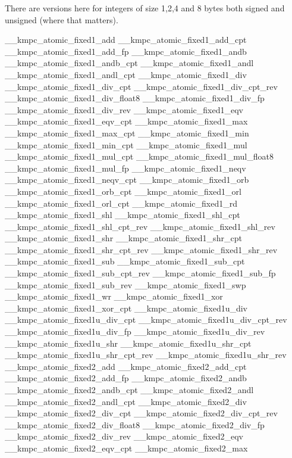 There are versions here for integers of size 1,2,4 and 8 bytes both signed and unsigned (where that matters). 
\begin{DoxyCode}
\_\_kmpc\_atomic\_fixed1\_add
\_\_kmpc\_atomic\_fixed1\_add\_cpt
\_\_kmpc\_atomic\_fixed1\_add\_fp
\_\_kmpc\_atomic\_fixed1\_andb
\_\_kmpc\_atomic\_fixed1\_andb\_cpt
\_\_kmpc\_atomic\_fixed1\_andl
\_\_kmpc\_atomic\_fixed1\_andl\_cpt
\_\_kmpc\_atomic\_fixed1\_div
\_\_kmpc\_atomic\_fixed1\_div\_cpt
\_\_kmpc\_atomic\_fixed1\_div\_cpt\_rev
\_\_kmpc\_atomic\_fixed1\_div\_float8
\_\_kmpc\_atomic\_fixed1\_div\_fp
\_\_kmpc\_atomic\_fixed1\_div\_rev
\_\_kmpc\_atomic\_fixed1\_eqv
\_\_kmpc\_atomic\_fixed1\_eqv\_cpt
\_\_kmpc\_atomic\_fixed1\_max
\_\_kmpc\_atomic\_fixed1\_max\_cpt
\_\_kmpc\_atomic\_fixed1\_min
\_\_kmpc\_atomic\_fixed1\_min\_cpt
\_\_kmpc\_atomic\_fixed1\_mul
\_\_kmpc\_atomic\_fixed1\_mul\_cpt
\_\_kmpc\_atomic\_fixed1\_mul\_float8
\_\_kmpc\_atomic\_fixed1\_mul\_fp
\_\_kmpc\_atomic\_fixed1\_neqv
\_\_kmpc\_atomic\_fixed1\_neqv\_cpt
\_\_kmpc\_atomic\_fixed1\_orb
\_\_kmpc\_atomic\_fixed1\_orb\_cpt
\_\_kmpc\_atomic\_fixed1\_orl
\_\_kmpc\_atomic\_fixed1\_orl\_cpt
\_\_kmpc\_atomic\_fixed1\_rd
\_\_kmpc\_atomic\_fixed1\_shl
\_\_kmpc\_atomic\_fixed1\_shl\_cpt
\_\_kmpc\_atomic\_fixed1\_shl\_cpt\_rev
\_\_kmpc\_atomic\_fixed1\_shl\_rev
\_\_kmpc\_atomic\_fixed1\_shr
\_\_kmpc\_atomic\_fixed1\_shr\_cpt
\_\_kmpc\_atomic\_fixed1\_shr\_cpt\_rev
\_\_kmpc\_atomic\_fixed1\_shr\_rev
\_\_kmpc\_atomic\_fixed1\_sub
\_\_kmpc\_atomic\_fixed1\_sub\_cpt
\_\_kmpc\_atomic\_fixed1\_sub\_cpt\_rev
\_\_kmpc\_atomic\_fixed1\_sub\_fp
\_\_kmpc\_atomic\_fixed1\_sub\_rev
\_\_kmpc\_atomic\_fixed1\_swp
\_\_kmpc\_atomic\_fixed1\_wr
\_\_kmpc\_atomic\_fixed1\_xor
\_\_kmpc\_atomic\_fixed1\_xor\_cpt
\_\_kmpc\_atomic\_fixed1u\_div
\_\_kmpc\_atomic\_fixed1u\_div\_cpt
\_\_kmpc\_atomic\_fixed1u\_div\_cpt\_rev
\_\_kmpc\_atomic\_fixed1u\_div\_fp
\_\_kmpc\_atomic\_fixed1u\_div\_rev
\_\_kmpc\_atomic\_fixed1u\_shr
\_\_kmpc\_atomic\_fixed1u\_shr\_cpt
\_\_kmpc\_atomic\_fixed1u\_shr\_cpt\_rev
\_\_kmpc\_atomic\_fixed1u\_shr\_rev
\_\_kmpc\_atomic\_fixed2\_add
\_\_kmpc\_atomic\_fixed2\_add\_cpt
\_\_kmpc\_atomic\_fixed2\_add\_fp
\_\_kmpc\_atomic\_fixed2\_andb
\_\_kmpc\_atomic\_fixed2\_andb\_cpt
\_\_kmpc\_atomic\_fixed2\_andl
\_\_kmpc\_atomic\_fixed2\_andl\_cpt
\_\_kmpc\_atomic\_fixed2\_div
\_\_kmpc\_atomic\_fixed2\_div\_cpt
\_\_kmpc\_atomic\_fixed2\_div\_cpt\_rev
\_\_kmpc\_atomic\_fixed2\_div\_float8
\_\_kmpc\_atomic\_fixed2\_div\_fp
\_\_kmpc\_atomic\_fixed2\_div\_rev
\_\_kmpc\_atomic\_fixed2\_eqv
\_\_kmpc\_atomic\_fixed2\_eqv\_cpt
\_\_kmpc\_atomic\_fixed2\_max

\end{DoxyCode}
